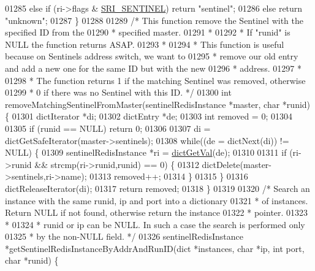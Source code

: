 \begin{DoxyCode}
{{{{{{{{{{{{{{{{01285     \textcolor{keywordflow}{else} \textcolor{keywordflow}{if} (ri->flags & \hyperlink{sentinel_8c_a8ed55207b2af5d2dd314c951ef253f64}{SRI\_SENTINEL}) \textcolor{keywordflow}{return} \textcolor{stringliteral}{"sentinel"};
01286     \textcolor{keywordflow}{else} \textcolor{keywordflow}{return} \textcolor{stringliteral}{"unknown"};
01287 \}
01288 
01289 \textcolor{comment}{/* This function remove the Sentinel with the specified ID from the}
01290 \textcolor{comment}{ * specified master.}
01291 \textcolor{comment}{ *}
01292 \textcolor{comment}{ * If "runid" is NULL the function returns ASAP.}
01293 \textcolor{comment}{ *}
01294 \textcolor{comment}{ * This function is useful because on Sentinels address switch, we want to}
01295 \textcolor{comment}{ * remove our old entry and add a new one for the same ID but with the new}
01296 \textcolor{comment}{ * address.}
01297 \textcolor{comment}{ *}
01298 \textcolor{comment}{ * The function returns 1 if the matching Sentinel was removed, otherwise}
01299 \textcolor{comment}{ * 0 if there was no Sentinel with this ID. */}
01300 \textcolor{keywordtype}{int} removeMatchingSentinelFromMaster(sentinelRedisInstance *master, \textcolor{keywordtype}{char} *runid) \{
01301     dictIterator *di;
01302     dictEntry *de;
01303     \textcolor{keywordtype}{int} removed = 0;
01304 
01305     \textcolor{keywordflow}{if} (runid == NULL) \textcolor{keywordflow}{return} 0;
01306 
01307     di = dictGetSafeIterator(master->sentinels);
01308     \textcolor{keywordflow}{while}((de = dictNext(di)) != NULL) \{
01309         sentinelRedisInstance *ri = \hyperlink{dict_8h_ae8d2cc391873b2bea2b87c4f80f43120}{dictGetVal}(de);
01310 
01311         \textcolor{keywordflow}{if} (ri->runid && strcmp(ri->runid,runid) == 0) \{
01312             dictDelete(master->sentinels,ri->name);
01313             removed++;
01314         \}
01315     \}
01316     dictReleaseIterator(di);
01317     \textcolor{keywordflow}{return} removed;
01318 \}
01319 
01320 \textcolor{comment}{/* Search an instance with the same runid, ip and port into a dictionary}
01321 \textcolor{comment}{ * of instances. Return NULL if not found, otherwise return the instance}
01322 \textcolor{comment}{ * pointer.}
01323 \textcolor{comment}{ *}
01324 \textcolor{comment}{ * runid or ip can be NULL. In such a case the search is performed only}
01325 \textcolor{comment}{ * by the non-NULL field. */}
01326 sentinelRedisInstance *getSentinelRedisInstanceByAddrAndRunID(dict *instances, \textcolor{keywordtype}{char} *ip, \textcolor{keywordtype}{int} port, \textcolor{keywordtype}{
      char} *runid) \{
}}}}}}}}}}}}}}}}
\end{DoxyCode}
